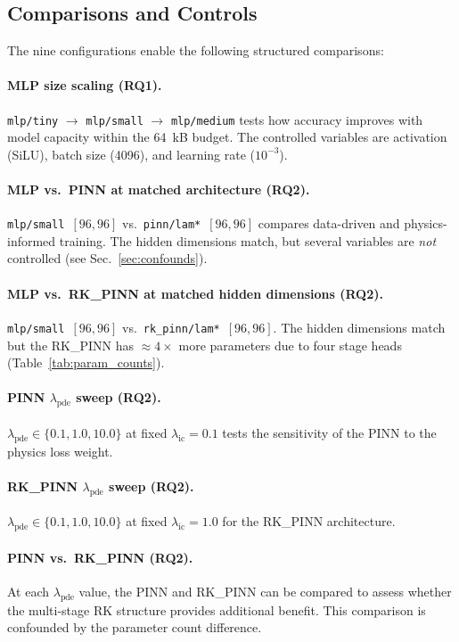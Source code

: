 \documentclass[a4paper,11pt]{article}
\newcommand{\SI}[2]{#1~#2}
\newcommand{\kilo}{k}
\newcommand{\byte}{B}
\begin{document}
\subsection{Comparisons and Controls}

The nine configurations enable the following structured comparisons:

\paragraph{MLP size scaling (RQ1).}
\texttt{mlp/tiny} $\to$ \texttt{mlp/small} $\to$ \texttt{mlp/medium}
tests how accuracy improves with model capacity within the
\SI{64}{\kilo\byte} budget.  The controlled variables are activation
(SiLU), batch size (4096), and learning rate ($10^{-3}$).

\paragraph{MLP vs.\ PINN at matched architecture (RQ2).}
\texttt{mlp/small}~$[96,96]$ vs.\ \texttt{pinn/lam*}~$[96,96]$ compares
data-driven and physics-informed training.  The hidden dimensions match,
but several variables are \emph{not} controlled (see
Sec.~\ref{sec:confounds}).

\paragraph{MLP vs.\ RK\_PINN at matched hidden dimensions (RQ2).}
\texttt{mlp/small}~$[96,96]$ vs.\ \texttt{rk\_pinn/lam*}~$[96,96]$.
The hidden dimensions match but the RK\_PINN has $\approx 4\times$ more
parameters due to four stage heads (Table~\ref{tab:param_counts}).

\paragraph{PINN $\lambda_\text{pde}$ sweep (RQ2).}
$\lambda_\text{pde} \in \{0.1, 1.0, 10.0\}$ at fixed
$\lambda_\text{ic} = 0.1$ tests the sensitivity of the PINN to the
physics loss weight.

\paragraph{RK\_PINN $\lambda_\text{pde}$ sweep (RQ2).}
$\lambda_\text{pde} \in \{0.1, 1.0, 10.0\}$ at fixed
$\lambda_\text{ic} = 1.0$ for the RK\_PINN architecture.

\paragraph{PINN vs.\ RK\_PINN (RQ2).}
At each $\lambda_\text{pde}$ value, the PINN and RK\_PINN can be
compared to assess whether the multi-stage RK structure provides
additional benefit.  This comparison is confounded by the parameter
count difference.
\end{document}
